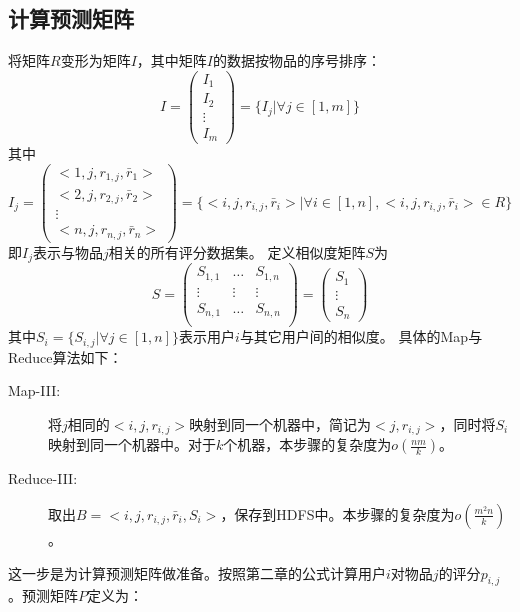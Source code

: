 \subsection{计算预测矩阵}
将矩阵$R$变形为矩阵$I$，其中矩阵$I$的数据按物品的序号排序：
\begin{equation}
I=\left(
\begin{array}{c}
I_1 \\
I_2 \\
\vdots \\
I_m
\end{array}
\right) = \{I_j|\forall j\in [1,m] \}
\end{equation}
其中
\begin{equation}
I_j=\left(
\begin{array}{c}
<1,j,r_{1,j},\bar{r}_1 > \\
<2,j,r_{2,j},\bar{r}_2 > \\
\vdots \\
<n,j,r_{n,j},\bar{r}_n >
\end{array}
\right) = \{<i,j,r_{i,j},\bar{r}_i >|\forall i\in [1,n], <i,j,r_{i,j},\bar{r}_i > \in R\}
\end{equation}
即$I_j$表示与物品$j$相关的所有评分数据集。
定义相似度矩阵$S$为
\begin{equation}
S=\left(
\begin{array}{ccc}
S_{1,1} & \ldots & S_{1,n} \\
\vdots & \vdots & \vdots \\
S_{n,1} & \ldots & S_{n,n} \\
\end{array}
\right) = \left(
\begin{array}{c}
S_1 \\
\vdots\\
S_n
\end{array}
\right)
\end{equation}
其中$S_i=\{S_{i,j}|\forall j\in [1,n] \}$表示用户$i$与其它用户间的相似度。
具体的Map与Reduce算法如下：
\begin{description}
\item[Map-III:] 将$j$相同的$<i,j,r_{i,j}>$映射到同一个机器中，简记为$<j,r_{i,j}>$，同时将$S_i$映射到同一个机器中。对于$k$个机器，本步骤的复杂度为$o(\frac{nm}{k})$。
\item[Reduce-III:] 取出$B=<i,j,r_{i,j},\bar{r}_i ,S_i>$，保存到HDFS中。本步骤的复杂度为$o(\frac{m^2n}{k})$。
\end{description}
这一步是为计算预测矩阵做准备。按照第二章的公式计算用户$i$对物品$j$的评分$p_{i,j}$。预测矩阵$P$定义为：
